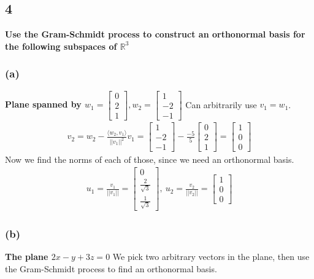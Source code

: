 \documentclass[10pt,letterpaper]{article}
\begin{document}
	\subsection*{4}\textbf{Use the Gram-Schmidt process to construct an orthonormal basis for the following subspaces of $\mathbb{R}^3$}
	\subsubsection*{(a)} \textbf{Plane spanned by $w_1 = \begin{bmatrix}
		0 \\ 2 \\ 1
		\end{bmatrix}, w_2 = \begin{bmatrix}
		1 \\ -2 \\ -1
		\end{bmatrix}$} 
		Can arbitrarily use $v_1 = w_1$. 
		\begin{align*}
		v_2 = w_2 - \frac{\langle w_2 , v_1 \rangle}{||v_1||^2} v_1 = \begin{bmatrix}
		1 \\ -2 \\ -1
		\end{bmatrix} - \frac{-5}{5} \begin{bmatrix}
		0 \\ 2 \\ 1
		\end{bmatrix} = \begin{bmatrix}
		1 \\ 0 \\ 0
		\end{bmatrix}
		\end{align*}
		Now we find the norms of each of those, since we need an orthonormal basis. 
		\begin{align*}
		\boxed{u_1 = \frac{v_1}{||v_1||} = \begin{bmatrix}
			0 \\ \frac{2}{\sqrt{3}} \\ \frac{1}{\sqrt{3}}
			\end{bmatrix}, \: u_2 = \frac{v_2}{||v_2||}  = \begin{bmatrix}
			1 \\ 0 \\ 0
			\end{bmatrix} } 
		\end{align*}
	\subsubsection*{(b)} \textbf{The plane $2x - y + 3z = 0$}
	We pick two arbitrary vectors in the plane, then use the Gram-Schmidt process to find an orthonormal basis. 
	 
\end{document}
